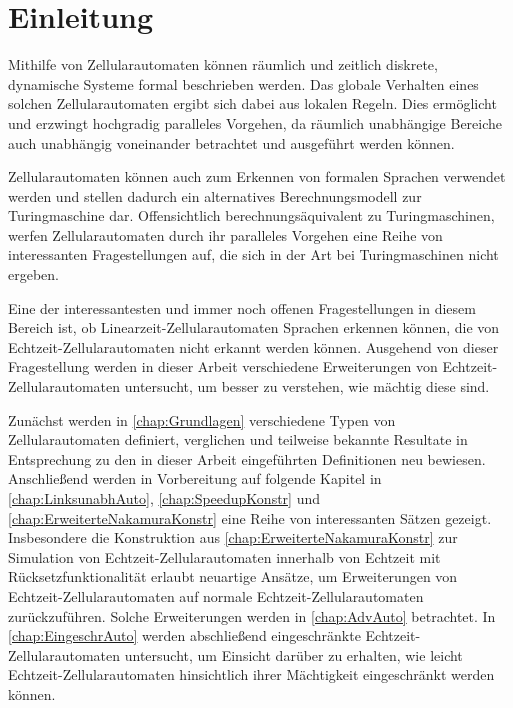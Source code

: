 \chapter{Einleitung}

Mithilfe von Zellularautomaten können räumlich und zeitlich diskrete, dynamische Systeme formal beschrieben werden.
Das globale Verhalten eines solchen Zellularautomaten ergibt sich dabei aus lokalen Regeln.
Dies ermöglicht und erzwingt hochgradig paralleles Vorgehen, da räumlich unabhängige Bereiche auch unabhängig voneinander betrachtet und ausgeführt werden können.

Zellularautomaten können auch zum Erkennen von formalen Sprachen verwendet werden und stellen dadurch ein alternatives Berechnungsmodell zur Turingmaschine dar.
Offensichtlich berechnungsäquivalent zu Turingmaschinen, werfen Zellularautomaten durch ihr paralleles Vorgehen eine Reihe von interessanten Fragestellungen auf,
die sich in der Art bei Turingmaschinen nicht ergeben.

Eine der interessantesten und immer noch offenen Fragestellungen in diesem Bereich ist,
ob Linearzeit-Zellularautomaten Sprachen erkennen können, die von Echtzeit-Zellularautomaten nicht erkannt werden können.
Ausgehend von dieser Fragestellung werden in dieser Arbeit verschiedene Erweiterungen von Echtzeit-Zellularautomaten untersucht,
um besser zu verstehen, wie mächtig diese sind.

Zunächst werden in \cref{chap:Grundlagen} verschiedene Typen von Zellularautomaten definiert, verglichen und teilweise bekannte Resultate
in Entsprechung zu den in dieser Arbeit eingeführten Definitionen neu bewiesen.
Anschließend werden in Vorbereitung auf folgende Kapitel in \cref{chap:LinksunabhAuto}, \cref{chap:SpeedupKonstr} und \cref{chap:ErweiterteNakamuraKonstr}
eine Reihe von interessanten Sätzen gezeigt.
Insbesondere die Konstruktion aus \cref{chap:ErweiterteNakamuraKonstr}
zur Simulation von Echtzeit-Zellularautomaten innerhalb von Echtzeit mit Rücksetzfunktionalität
erlaubt neuartige Ansätze, um Erweiterungen von Echtzeit-Zellularautomaten auf normale Echtzeit-Zellularautomaten zurückzuführen.
Solche Erweiterungen werden in \cref{chap:AdvAuto} betrachtet.
In \cref{chap:EingeschrAuto} werden abschließend eingeschränkte Echtzeit-Zellularautomaten untersucht, um Einsicht darüber zu erhalten,
wie leicht Echtzeit-Zellularautomaten hinsichtlich ihrer Mächtigkeit eingeschränkt werden können.

